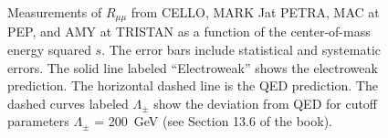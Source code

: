 \documentclass[a4paper,10pt]{article}
\begin{document}
\begin{figure}[htb]
\begin{center}
\caption{Measurements of $R_{\mu\mu}$ from CELLO, MARK Jat PETRA,
MAC at PEP, and AMY at TRISTAN as a function of the
center-of-mass energy squared $s$. The error bars include statistical and systematic errors.
The solid line labeled ``Electroweak'' shows the electroweak prediction. The horizontal dashed line
is the QED prediction.
The dashed curves labeled $\Lambda_\pm$ show the deviation from QED for cutoff parameters $\Lambda_\pm$ = 200~GeV
(see Section 13.6 of the book). }
\end{center}
\end{figure}
%
\end{document}
